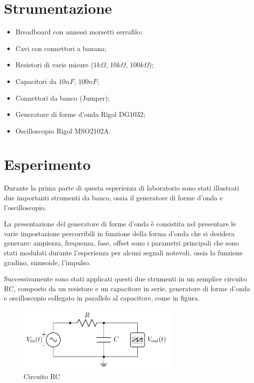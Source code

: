     \section{Strumentazione}
    \begin{itemize}
        \item Breadboard con annessi morsetti serrafilo;
        \item Cavi con connettori a banana;
        \item Resistori di varie misure ($1k\Omega$, $10k\Omega$, $100k\Omega$);
        \item Capacitori da $10nF$, $100nF$;
        \item Connettori da banco (Jumper);
        \item Generatore di forme d'onda Rigol DG1032;
        \item Oscilloscopio Rigol MSO2102A.
    \end{itemize}

    \section{Esperimento}
    
    Durante la prima parte di questa esperienza di laboratorio sono stati illustrati due
    importanti strumenti da banco, ossia il generatore di forme d'onda e l'oscilloscopio. \par
    La presentazione del generatore di forme d'onda è consistita nel presentare le varie impostazione
    percorribili in funzione della forma d'onda che si desidera generare: ampiezza, frequenza, fase, offset
    sono i parametri principali che sono stati modulati durante l'esperienza per alcuni segnali notevoli,
    ossia la funzione gradino, sinusoide, l'impulso. \par
    Successivamente sono stati applicati questi due strumenti in un semplice circuito RC, composto da
    un resistore e un capacitore in serie, generatore di forme d'onda e oscilloscopio collegato in parallelo
    al capacitore, come in figura.

    \begin{figure}[!h]
        \begin{center}
            \includegraphics[width = 8cm]{circuito.png}
            \caption{Circuito RC}
        \end{center}
    \end{figure}
        
